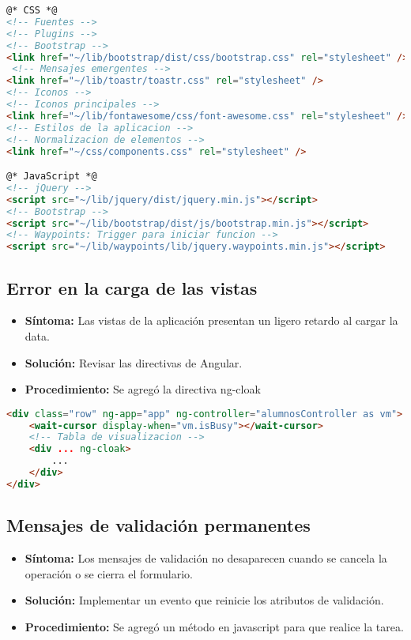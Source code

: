 \begin{lstlisting}[language=html]
@* CSS *@
<!-- Fuentes -->
<!-- Plugins -->
<!-- Bootstrap -->
<link href="~/lib/bootstrap/dist/css/bootstrap.css" rel="stylesheet" /> 
 <!-- Mensajes emergentes -->
<link href="~/lib/toastr/toastr.css" rel="stylesheet" />
<!-- Iconos -->
<!-- Iconos principales -->
<link href="~/lib/fontawesome/css/font-awesome.css" rel="stylesheet" /> 
<!-- Estilos de la aplicacion -->
<!-- Normalizacion de elementos -->
<link href="~/css/components.css" rel="stylesheet" /> 

@* JavaScript *@
<!-- jQuery -->
<script src="~/lib/jquery/dist/jquery.min.js"></script> 
<!-- Bootstrap -->
<script src="~/lib/bootstrap/dist/js/bootstrap.min.js"></script> 
<!-- Waypoints: Trigger para iniciar funcion -->
<script src="~/lib/waypoints/lib/jquery.waypoints.min.js"></script> 
\end{lstlisting}

\subsection{Error en la carga de las vistas}
\begin{itemize}
	\item \textbf{Síntoma:} Las vistas de la aplicación presentan un ligero retardo al cargar la data.
	\item \textbf{Solución:} Revisar las directivas de Angular. 
	\item \textbf{Procedimiento:} Se agregó la directiva ng-cloak
\end{itemize}

\begin{lstlisting}[language=html]
<div class="row" ng-app="app" ng-controller="alumnosController as vm">
	<wait-cursor display-when="vm.isBusy"></wait-cursor>
	<!-- Tabla de visualizacion -->
	<div ... ng-cloak>
		...
	</div>
</div>
\end{lstlisting}

\subsection{Mensajes de validación permanentes}
\begin{itemize}
	\item \textbf{Síntoma:} Los mensajes de validación no desaparecen cuando se cancela la operación o se cierra el formulario.
	\item \textbf{Solución:} Implementar un evento que reinicie los atributos de validación.
	\item \textbf{Procedimiento:} Se agregó un método en javascript para que realice la tarea.
\end{itemize}

